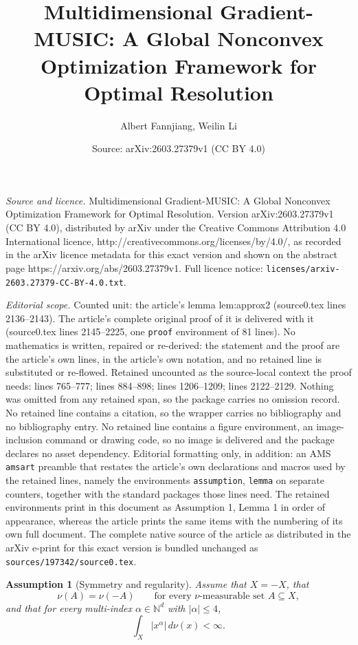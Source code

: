 \documentclass[10pt,a4paper]{amsart}
\title{Multidimensional Gradient-MUSIC: A Global Nonconvex Optimization Framework for Optimal Resolution}
\author{Albert Fannjiang, Weilin Li}
\date{Source: arXiv:2603.27379v1 (CC BY 4.0)}
\newtheorem{assumption}{Assumption}
\def\N{\mathbb{N}}
\renewcommand{\subset}{\subseteq}
\begin{document}
\maketitle

\noindent\emph{Source and licence.} Multidimensional Gradient-MUSIC: A Global Nonconvex Optimization Framework for Optimal Resolution. Version arXiv:2603.27379v1 (CC BY 4.0), distributed by arXiv under the Creative Commons Attribution 4.0 International licence, http://creativecommons.org/licenses/by/4.0/, as recorded in the arXiv licence metadata for this exact version and shown on the abstract page https://arxiv.org/abs/2603.27379v1. Full licence notice: \texttt{licenses/arxiv-2603.27379-CC-BY-4.0.txt}.\par\smallskip

\noindent\textit{Editorial scope.} Counted unit: the article's lemma lem:approx2 (source0.tex lines 2136--2143). The article's complete original proof of it is delivered with it (source0.tex lines 2145--2225, one \texttt{proof} environment of 81 lines). No mathematics is written, repaired or re-derived: the statement and the proof are the article's own lines, in the article's own notation, and no retained line is substituted or re-flowed.  Retained uncounted as the source-local context the proof needs: lines 765--777; lines 884--898; lines 1206--1209; lines 2122--2129.  Nothing was omitted from any retained span, so the package carries no omission record.  No retained line contains a citation, so the wrapper carries no bibliography and no bibliography entry.  No retained line contains a figure environment, an image-inclusion command or drawing code, so no image is delivered and the package declares no asset dependency.  Editorial formatting only, in addition: an AMS \texttt{amsart} preamble that restates the article's own declarations and macros used by the retained lines, namely the environments \texttt{assumption}, \texttt{lemma} on separate counters, together with the standard packages those lines need.  The retained environments print in this document as Assumption 1, Lemma 1 in order of appearance, whereas the article prints the same items with the numbering of its own full document.  The complete native source of the article as distributed in the arXiv e-print for this exact version is bundled unchanged as \texttt{sources/197342/source0.tex}.
\begin{assumption}[Symmetry and regularity]
\label{assump:symmetry}
Assume that $X=-X$, that
\[
\nu(A)=\nu(-A)
\qquad\text{for every $\nu$-measurable set } A\subset X,
\]
and that for every multi-index $\alpha\in\N^d$ with $|\alpha|\le 4$,
\begin{equation}
\label{eq:moment}
\int_X |x^\alpha|\,d\nu(x)<\infty.
\end{equation}
\end{assumption}
\end{document}
